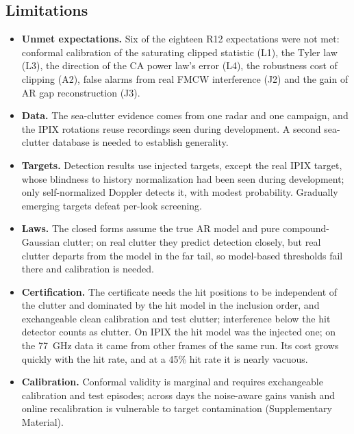 \documentclass[journal]{IEEEtran}
\begin{document}
\subsection{Limitations}\label{sec:limits}
\begin{itemize}[leftmargin=*,itemsep=1pt]
\item \textbf{Unmet expectations.} Six of the eighteen R12 expectations were not met: conformal calibration of the saturating clipped statistic (L1), the Tyler law (L3), the direction of the CA power law's error (L4), the robustness cost of clipping (A2), false alarms from real FMCW interference (J2) and the gain of AR gap reconstruction (J3).
\item \textbf{Data.} The sea-clutter evidence comes from one radar and one campaign, and the IPIX rotations reuse recordings seen during development. A second sea-clutter database \cite{dewind2010csir} is needed to establish generality.
\item \textbf{Targets.} Detection results use injected targets, except the real IPIX target, whose blindness to history normalization had been seen during development; only self-normalized Doppler detects it, with modest probability. Gradually emerging targets defeat per-look screening.
\item \textbf{Laws.} The closed forms assume the true AR model and pure compound-Gaussian clutter; on real clutter they predict detection closely, but real clutter departs from the model in the far tail, so model-based thresholds fail there and calibration is needed.
\item \textbf{Certification.} The certificate needs the hit positions to be independent of the clutter and dominated by the hit model in the inclusion order, and exchangeable clean calibration and test clutter; interference below the hit detector counts as clutter. On IPIX the hit model was the injected one; on the 77~GHz data it came from other frames of the same run. Its cost grows quickly with the hit rate, and at a 45\% hit rate it is nearly vacuous.
\item \textbf{Calibration.} Conformal validity is marginal and requires exchangeable calibration and test episodes; across days the noise-aware gains vanish and online recalibration is vulnerable to target contamination \cite{gibbs2021aci} (Supplementary Material).
\end{itemize}
\end{document}
